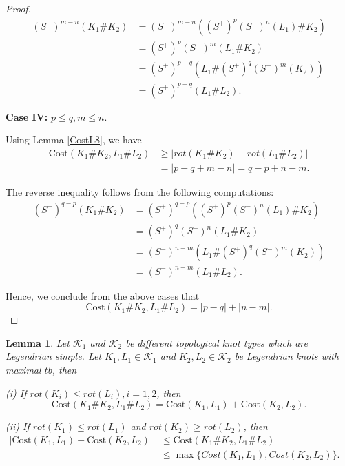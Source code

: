 \documentclass[11pt]{amsart}
\numberwithin{equation}{section}
\theoremstyle{plain}
\newtheorem{Lemma}[equation]{Lemma}
\theoremstyle{definition}
\theoremstyle{remark} \newtheorem{remark}[equation]{Remark}
\theoremstyle{remark} \newtheorem{observation}[equation]{Observation}
\newcommand{\Cost}{\text{Cost}}
\begin{document}
\begin{proof}
   \begin{align*}
       (S^-)^{m-n}(K_1\#K_2)&=(S^-)^{m-n}((S^+)^p(S^-)^n(L_1)\#K_2)\\
       &=(S^+)^p(S^-)^{m}(L_1\#K_2)\\
       &=(S^+)^{p-q}(L_1\#(S^+)^q(S^-)^m(K_2))\\
       &=(S^+)^{p-q}(L_1\#L_2).
   \end{align*}

   
   \noindent \textbf{Case IV:} $p\leq q,m\leq n$.
   

      Using Lemma \ref{CostL8}, we have
\begin{align*}
    \Cost(K_1\#K_2,L_1\#L_2)&\geq |rot(K_1\#K_2)-rot(L_1\#L_2)|\\
    &=|p-q+m-n|=q-p+n-m.
\end{align*}

   The reverse inequality follows from the following computations:
\begin{align*}
       (S^+)^{q-p}(K_1\#K_2)&=(S^+)^{q-p}((S^+)^p(S^-)^n(L_1)\#K_2)\\
       &=(S^+)^q(S^-)^{n}(L_1\#K_2)\\
       &=(S^-)^{n-m}(L_1\#(S^+)^q(S^-)^m(K_2))\\
       &=(S^-)^{n-m}(L_1\#L_2).
   \end{align*}
  

   Hence, we conclude from the above cases that $$\Cost(K_1\#K_2,L_1\#L_2)=|p-q|+|n-m|.$$
\end{proof}

\begin{Lemma}\label{CostL22}
    Let $\mathcal{K}_1$ and $\mathcal{K}_2$ be different topological knot types which are Legendrian simple. Let $K_1,L_1\in \mathcal{K}_1$ and $K_2,L_2\in\mathcal{K}_2$ be Legendrian knots with maximal $tb$, then 
    
    \noindent (i) If $rot(K_i)\leq rot(L_i),i=1,2$, then $$\Cost(K_1\#K_2,L_1\#L_2)=\Cost(K_1,L_1)+\Cost(K_2,L_2).$$
       
\noindent (ii) If $rot(K_1)\leq rot(L_1)$ and $rot(K_2)\geq rot(L_2)$, then
        \begin{align*}
            |\Cost(K_1,L_1)-\Cost(K_2,L_2)|&\leq \Cost(K_1\#K_2,L_1\#L_2)\\
            &\leq \max\{Cost(K_1,L_1),Cost(K_2,L_2)\}.&&
        \end{align*}
    
\end{Lemma}
\end{document}
